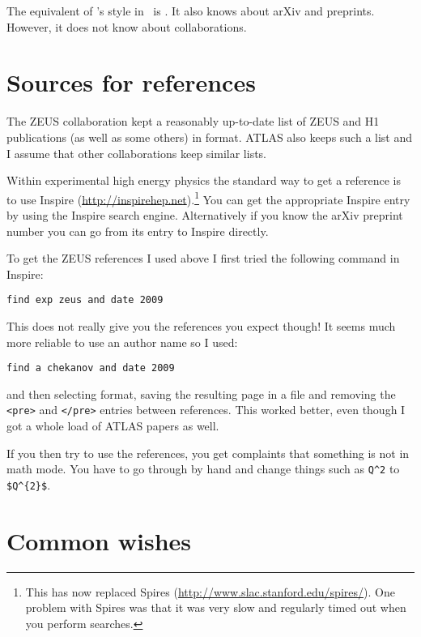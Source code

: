 The equivalent of 's  style in \BibTeX\ is
. It also knows about arXiv and preprints. However, it
does not know about collaborations.


\section{Sources for references}
\label{sec:ref:sources}

The ZEUS collaboration kept a reasonably up-to-date list of ZEUS and
H1 publications (as well as some others) in \BibTeX{} format. ATLAS
also keeps such a list and I assume that other collaborations keep
similar lists.

Within experimental high energy physics the standard way to get a
reference is to use Inspire
(\url{http://inspirehep.net}).\footnote{This has now replaced Spires
(\url{http://www.slac.stanford.edu/spires/}).
One problem with Spires was that it was very slow and regularly
timed out when you perform searches.} You can get the appropriate
Inspire entry by using the Inspire search engine. Alternatively if you
know the arXiv preprint number you can go from its entry to Inspire
directly.

To get the ZEUS references I used above I first tried the following
command in Inspire:
\begin{verbatim}
find exp zeus and date 2009
\end{verbatim}
This does not really give you the references you expect though! It
seems much more reliable to use an author name so I used:
\begin{verbatim}
find a chekanov and date 2009
\end{verbatim}
and then selecting \BibTeX{} format, saving the resulting page in a file
and removing the \texttt{<pre>} and \texttt{</pre>} entries between
references. This worked better, even though I got a whole load of
ATLAS papers as well.

If you then try to use the references, you get complaints that
something is not in math mode. You have to go through by hand and
change things such as \verb+Q^2+ to \verb+$Q^{2}$+.


\section{Common wishes}
\label{sec:ref:tips}

